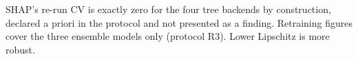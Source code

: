 \begin{table}[t]
\centering
\caption{RQ2 --- explanation stability decomposed into three sources: explainer randomness (re-run), input perturbation (Lipschitz), and model retraining. Medians over all cells.}
\label{tab:stability}
\small
{}
\par\vspace{2pt}\footnotesize SHAP's re-run CV is exactly zero for the four tree backends by construction, declared a priori in the protocol and not presented as a finding. Retraining figures cover the three ensemble models only (protocol R3). Lower Lipschitz is more robust.
\end{table}

